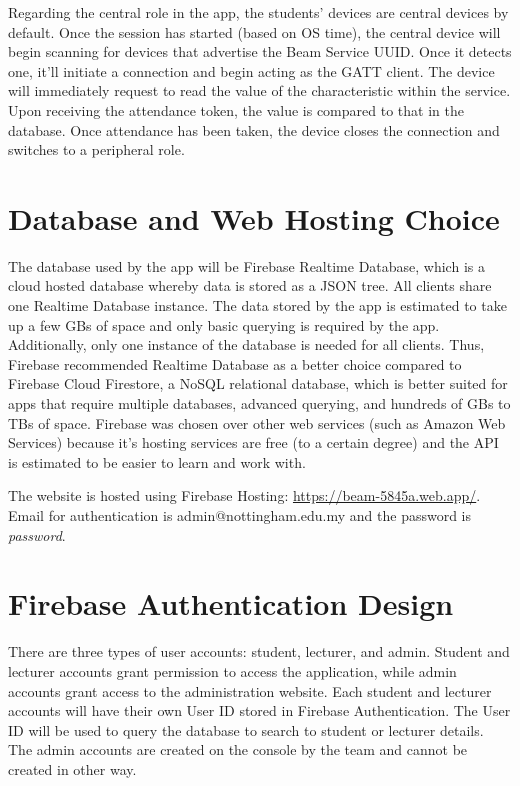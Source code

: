 \documentclass[../report.tex]{subfiles}
\begin{document}
Regarding the central role in the app, the students’ devices are central devices by default. Once the session has started (based on OS time), the central device will begin scanning for devices that advertise the Beam Service UUID. Once it detects one, it’ll initiate a connection and begin acting as the GATT client. The device will immediately request to read the value of the characteristic within the service. Upon receiving the attendance token, the value is compared to that in the database. Once attendance has been taken, the device closes the connection and switches to a peripheral role.

\section{Database and Web Hosting Choice}
The database used by the app will be Firebase Realtime Database, which is a cloud hosted database whereby data is stored as a JSON tree. All clients share one Realtime Database instance. The data stored by the app is estimated to take up a few GBs of space and only basic querying is required by the app. Additionally, only one instance of the database is needed for all clients. Thus, Firebase recommended Realtime Database as a better choice compared to Firebase Cloud Firestore, a NoSQL relational database, which is better suited for apps that require multiple databases, advanced querying, and hundreds of GBs to TBs of space. Firebase was chosen over other web services (such as Amazon Web Services) because it’s hosting services are free (to a certain degree) and the API is estimated to be easier to learn and work with.

The website is hosted using Firebase Hosting: \url{https://beam-5845a.web.app/}. Email for authentication is admin@nottingham.edu.my and the password is \textit{password}.

\section{Firebase Authentication Design}
There are three types of user accounts: student, lecturer, and admin. Student and lecturer accounts grant permission to access the application, while admin accounts grant access to the administration website. Each student and lecturer accounts will have their own User ID stored in Firebase Authentication\cite{firebase-auth}. The User ID will be used to query the database to search to student or lecturer details. The admin accounts are created on the console by the team and cannot be created in other way.
\end{document}
